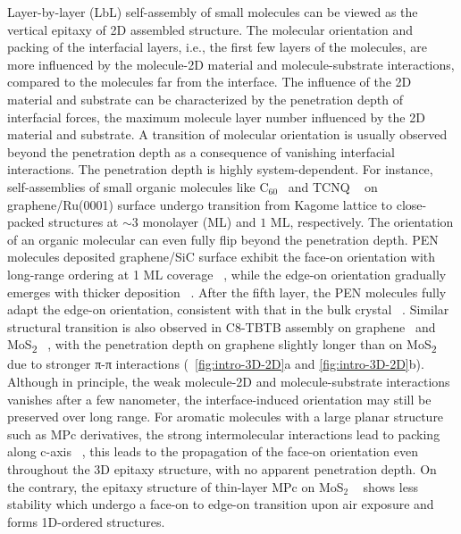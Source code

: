 Layer-by-layer (LbL) self-assembly of small molecules can be viewed as
the vertical epitaxy of 2D assembled structure. The molecular
orientation and packing of the interfacial layers, i.e., the first few
layers of the molecules, are more influenced by the molecule-2D
material and molecule-substrate interactions, compared to the
molecules far from the interface. The influence of the 2D material and
substrate can be  characterized by the penetration depth of interfacial forces, \ie the
maximum molecule layer number influenced by the 2D material and
substrate.
%
A transition of
molecular orientation is usually observed beyond the penetration depth
as a consequence of vanishing interfacial interactions.
%
The penetration depth is highly system-dependent.
%
For instance, self-assemblies of small organic molecules like
C\(_{\text{60}}\)~\cite{Lu_2012_c60_gr_moire} and TCNQ
~\cite{Maccariello_2014_TCNQ_gr_Ru} on graphene/\allowbreak{}Ru(0001) surface undergo
transition from Kagome lattice to close-packed structures at $\sim$3
monolayer (ML) and $1$ ML, respectively.
%
The orientation of an organic molecular can even fully flip beyond the
penetration depth. PEN molecules deposited graphene/SiC surface
exhibit the face-on orientation with long-range ordering at 1 ML
coverage ~\cite{Jung_2014_pentacene}, while the edge-on orientation
gradually emerges with thicker deposition
~\cite{Chen_2008_transition_pentacene}. After the fifth layer, the PEN
molecules fully adapt the edge-on orientation, consistent with that in
the bulk crystal ~\cite{Ruiz_2004_bulk_pentacene}. Similar structural
transition is also observed in C8-TBTB assembly on
graphene~\cite{He_2014_C8BTBT_gr} and MoS\textsubscript{2}
~\cite{He_2015_C8BTBT_MoS2}, with the penetration depth on graphene
slightly longer than on MoS\textsubscript{2} due to stronger π-π
interactions (~\autoref{fig:intro-3D-2D}a and
\autoref{fig:intro-3D-2D}b).
%
Although in principle, the weak molecule-2D and molecule-substrate
interactions vanishes after a few nano\-meter, the interface-induced orientation may still be preserved over long range.
For aromatic molecules with a large planar structure
such as MPc derivatives, the strong intermolecular interactions lead
to packing along c-axis
~\cite{Ren_2011_DFT_CuPc_epi_gr,Jiang_2014_F16Pc,Yoon_2010_crystal_F16cuPc},
this leads to the propagation of the face-on orientation even
throughout the 3D epitaxy structure, with no apparent penetration
depth. On the contrary, the epitaxy
structure of thin-layer MPc on MoS\(_{\text{2}}\)
~\cite{Zhang_2015_CuPc_MoS2} shows less stability which undergo a
face-on to edge-on transition upon air exposure and forms 1D-ordered
structures.

